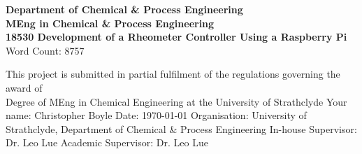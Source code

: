 \documentclass[twoside,a4]{report}
\def\atitle{Development of a Rheometer Controller Using a Raspberry Pi}
\def\thewords{8757} %
\begin{document}
	\begin{titlepage}
		\centering
		\vskip3cm
		{
			\bfseries\Large
			Department of Chemical \& Process Engineering\\
			\vskip1cm
			MEng in Chemical \& Process Engineering\\
			18530
			\vskip3cm
			\LARGE\atitle
		}
		\vskip3cm
		{\small Word Count: \thewords}
		\vskip1cm
		\begin{flushleft}
			This project is submitted in partial fulfilment of the regulations governing the award of \\
			Degree of MEng in Chemical Engineering at the University of Strathclyde
			\vskip2cm
			Your name: Christopher Boyle \hfill Date: \today
			\vskip1cm
			Organisation: University of Strathclyde, Department of Chemical \& Process Engineering\newline%
			In-house Supervisor: Dr. Leo Lue \newline%
			Academic Supervisor: Dr. Leo Lue
		\end{flushleft}
	\end{titlepage}

	\setcounter{page}{0}
	\begin{center}\newpage \end{center}
	
\end{document}

